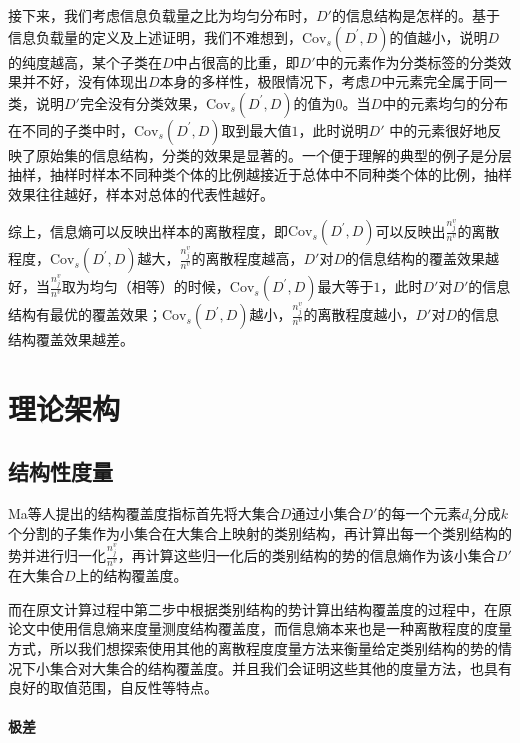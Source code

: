 \documentclass{../notes}
\newcommand{\Cov}{\text{Cov}}
\begin{document}
    接下来，我们考虑信息负载量之比为均匀分布时，$D'$的信息结构是怎样的。基于信息负载量的定义及上述证明，我们不难想到，$\Cov_s(D^\prime,D)$的值越小，说明$D$的纯度越高，某个子类在$D$中占很高的比重，即$D'$中的元素作为分类标签的分类效果并不好，没有体现出$D$本身的多样性，极限情况下，考虑$D$中元素完全属于同一类，说明$D'$完全没有分类效果，$\Cov_s(D^\prime,D)$的值为$0$。当$D$中的元素均匀的分布在不同的子类中时，$\Cov_s(D^\prime,D)$取到最大值$1$，此时说明$D'$ 中的元素很好地反映了原始集的信息结构，分类的效果是显著的。一个便于理解的典型的例子是分层抽样，抽样时样本不同种类个体的比例越接近于总体中不同种类个体的比例，抽样效果往往越好，样本对总体的代表性越好。

    综上，信息熵可以反映出样本的离散程度，即$\Cov_s(D^\prime,D)$可以反映出$\frac{n_j^v}{n^v}$的离散程度，$\Cov_s(D^\prime,D)$越大，$\frac{n_j^v}{n^v}$的离散程度越高，$D'$对$D$的信息结构的覆盖效果越好，当$\frac{n_j^v}{n^v}$取为均匀（相等）的时候，$\Cov_s(D^\prime,D)$最大等于$1$，此时$D'$对$D'$的信息结构有最优的覆盖效果；$\Cov_s(D^\prime,D)$越小，$\frac{n_j^v}{n^v}$的离散程度越小，$D'$对$D$的信息结构覆盖效果越差。

    \section{理论架构}

    \subsection{结构性度量}

    Ma等人提出的结构覆盖度指标首先将大集合$D$通过小集合$D'$的每一个元素$d_i$分成$k$个分割的子集作为小集合在大集合上映射的类别结构，再计算出每一个类别结构的势并进行归一化$\frac{n_j^v}{n^v}$，再计算这些归一化后的类别结构的势的信息熵作为该小集合$D'$在大集合$D$上的结构覆盖度。


    而在原文计算过程中第二步中根据类别结构的势计算出结构覆盖度的过程中，在原论文中使用信息熵来度量测度结构覆盖度，而信息熵本来也是一种离散程度的度量方式，所以我们想探索使用其他的离散程度度量方法\cite{刘颖1997关于有限集点分布均匀性的度量方法}来衡量给定类别结构的势的情况下小集合对大集合的结构覆盖度。并且我们会证明这些其他的度量方法，也具有良好的取值范围，自反性等特点。

    \paragraph*{极差}
\end{document}
